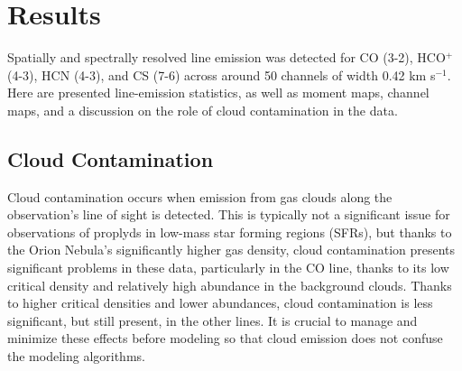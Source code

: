 \chapter{Results}
\label{chap:results}


Spatially and spectrally resolved line emission was detected for CO (3-2), HCO$^{+}$ (4-3), HCN (4-3), and CS (7-6) across around 50 channels of width 0.42 km s$^{-1}$. Here are presented line-emission statistics, as well as moment maps, channel maps, and a discussion on the role of cloud contamination in the data.


\bigskip

\section{Cloud Contamination}

Cloud contamination occurs when emission from gas clouds along the observation's line of sight is detected. This is typically not a significant issue for observations of proplyds in low-mass star forming regions (SFRs), but thanks to the Orion Nebula's significantly higher gas density, cloud contamination presents significant problems in these data, particularly in the CO line, thanks to its low critical density and relatively high abundance in the background clouds. Thanks to higher critical densities and lower abundances, cloud contamination is less significant, but still present, in the other lines. It is crucial to manage and minimize these effects before modeling so that cloud emission does not confuse the modeling algorithms.

\bigskip

